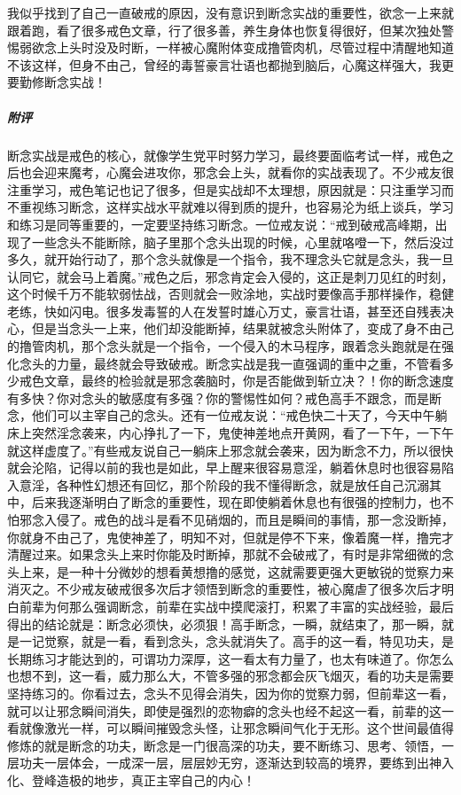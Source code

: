\begin{case}
    我似乎找到了自己一直破戒的原因，没有意识到断念实战的重要性，欲念一上来就跟着跑，看了很多戒色文章，行了很多善，养生身体也恢复得很好，但某次独处警惕弱欲念上头时没及时断，一样被心魔附体变成撸管肉机，尽管过程中清醒地知道不该这样，但身不由己，曾经的毒誓豪言壮语也都抛到脑后，心魔这样强大，我更要勤修断念实战！
    \subparagraph{附评} 断念实战是戒色的核心，就像学生党平时努力学习，最终要面临考试一样，戒色之后也会迎来魔考，心魔会进攻你，邪念会上头，就看你的实战表现了。不少戒友很注重学习，戒色笔记也记了很多，但是实战却不太理想，原因就是：只注重学习而不重视练习断念，这样实战水平就难以得到质的提升，也容易沦为纸上谈兵，学习和练习是同等重要的，一定要坚持练习断念。一位戒友说：“戒到破戒高峰期，出现了一些念头不能断除，脑子里那个念头出现的时候，心里就咯噔一下，然后没过多久，就开始行动了，那个念头就像是一个指令，我不理念头它就是念头，我一旦认同它，就会马上着魔。”戒色之后，邪念肯定会入侵的，这正是刺刀见红的时刻，这个时候千万不能软弱怯战，否则就会一败涂地，实战时要像高手那样操作，稳健老练，快如闪电。很多发毒誓的人在发誓时雄心万丈，豪言壮语，甚至还自残表决心，但是当念头一上来，他们却没能断掉，结果就被念头附体了，变成了身不由己的撸管肉机，那个念头就是一个指令，一个侵入的木马程序，跟着念头跑就是在强化念头的力量，最终就会导致破戒。断念实战是我一直强调的重中之重，不管看多少戒色文章，最终的检验就是邪念袭脑时，你是否能做到斩立决？！你的断念速度有多快？你对念头的敏感度有多强？你的警惕性如何？戒色高手不跟念，而是断念，他们可以主宰自己的念头。还有一位戒友说：“戒色快二十天了，今天中午躺床上突然淫念袭来，内心挣扎了一下，鬼使神差地点开黄网，看了一下午，一下午就这样虚度了。”有些戒友说自己一躺床上邪念就会袭来，因为断念不力，所以很快就会沦陷，记得以前的我也是如此，早上醒来很容易意淫，躺着休息时也很容易陷入意淫，各种性幻想还有回忆，那个阶段的我不懂得断念，就是放任自己沉溺其中，后来我逐渐明白了断念的重要性，现在即使躺着休息也有很强的控制力，也不怕邪念入侵了。戒色的战斗是看不见硝烟的，而且是瞬间的事情，那一念没断掉，你就身不由己了，鬼使神差了，明知不对，但就是停不下来，像着魔一样，撸完才清醒过来。如果念头上来时你能及时断掉，那就不会破戒了，有时是非常细微的念头上来，是一种十分微妙的想看黄想撸的感觉，这就需要更强大更敏锐的觉察力来消灭之。不少戒友破戒很多次后才领悟到断念的重要性，被心魔虐了很多次后才明白前辈为何那么强调断念，前辈在实战中摸爬滚打，积累了丰富的实战经验，最后得出的结论就是：断念必须快，必须狠！高手断念，一瞬，就结束了，那一瞬，就是一记觉察，就是一看，看到念头，念头就消失了。高手的这一看，特见功夫，是长期练习才能达到的，可谓功力深厚，这一看太有力量了，也太有味道了。你怎么也想不到，这一看，威力那么大，不管多强的邪念都会灰飞烟灭，看的功夫是需要坚持练习的。你看过去，念头不见得会消失，因为你的觉察力弱，但前辈这一看，就可以让邪念瞬间消失，即使是强烈的恋物癖的念头也经不起这一看，前辈的这一看就像激光一样，可以瞬间摧毁念头怪，让邪念瞬间气化于无形。这个世间最值得修炼的就是断念的功夫，断念是一门很高深的功夫，要不断练习、思考、领悟，一层功夫一层体会，一成深一层，层层妙无穷，逐渐达到较高的境界，要练到出神入化、登峰造极的地步，真正主宰自己的内心！
\end{case}

